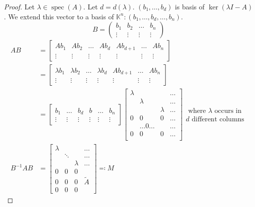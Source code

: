 \documentclass{article}
\numberwithin{lecref}{section}
\begin{document}
\begin{proof}
  Let $\lambda \in \operatorname{spec}(A)$. Let $d = d(\lambda)$. $(b_1, \dots, b_d)$ is basis of $\ker(\lambda I - A)$.
  We extend this vector to a basis of $\mathbb K^n:  (b_1, \dots, b_d, \dots, b_n)$.
  \[ B = \begin{pmatrix} b_1 & b_2 & \dots & b_n \\ \vdots & \vdots & \vdots & \vdots \end{pmatrix} \]
  \begin{align*}
    AB &= \begin{bmatrix} Ab_1 & Ab_2 & \dots & Ab_d & Ab_{d+1} & \dots & Ab_n \\ \vdots & \vdots & \vdots & \vdots & \vdots & \vdots & \vdots \end{bmatrix} \\
       &= \begin{bmatrix} \lambda b_1 & \lambda b_2 & \dots & \lambda b_d & Ab_{d+1} & \dots & Ab_n \\ \vdots & \vdots & \vdots & \vdots & \vdots & \vdots & \vdots \end{bmatrix} \\
	       &= \begin{bmatrix} b_1 & \dots & b_d & b & \dots & b_n \\ \vdots & \vdots & \vdots & \vdots & \vdots & \vdots \end{bmatrix} \begin{bmatrix} \lambda & & & \dots \\ & \lambda & & \dots \\ & & \lambda & \dots \\ 0 & 0 & 0 & \dots \\   & \dots 0 \dots &   & \dots \\ 0 & 0 & 0 & \dots \\ \end{bmatrix} \substack{\text{ where $\lambda$ occurs in} \\ \text{$d$ different columns}} \\
    B^{-1}AB &= \begin{bmatrix} \lambda & & & \dots \\ & \ddots & & \dots \\ & & \lambda & \dots \\ 0 & 0 & 0 & \\ 0 & 0 & 0 & \tilde A \\ 0 & 0 & 0 & \end{bmatrix} \eqqcolon M
  \end{align*}


\end{proof}
\end{document}

